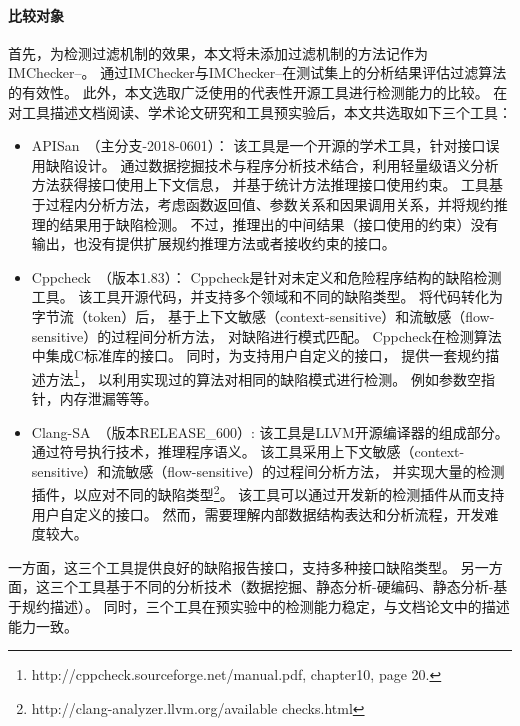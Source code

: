 \paragraph{ 比较对象}
首先，为检测过滤机制的效果，本文将未添加过滤机制的方法记作为IMChecker--。
通过IMChecker与IMChecker--在测试集上的分析结果评估过滤算法的有效性。
此外，本文选取广泛使用的代表性开源工具进行检测能力的比较。
在对工具描述文档阅读、学术论文研究和工具预实验后，本文共选取如下三个工具：
\begin{itemize}
	\item APISan~\cite{16-sec-apisan}（主分支-2018-0601）：
	该工具是一个开源的学术工具，针对接口误用缺陷设计。
	通过数据挖掘技术与程序分析技术结合，利用轻量级语义分析方法获得接口使用上下文信息，
	并基于统计方法推理接口使用约束。
	工具基于过程内分析方法，考虑函数返回值、参数关系和因果调用关系，并将规约推理的结果用于缺陷检测。
	不过，推理出的中间结果（接口使用的约束）没有输出，也没有提供扩展规约推理方法或者接收约束的接口。
	\item Cppcheck~\cite{cppcheck}（版本1.83）：
	Cppcheck是针对未定义和危险程序结构的缺陷检测工具。
	该工具开源代码，并支持多个领域和不同的缺陷类型。
	将代码转化为字节流（token）后，
	基于上下文敏感（context-sensitive）和流敏感（flow-sensitive）的过程间分析方法，
	对缺陷进行模式匹配。
	Cppcheck在检测算法中集成C标准库的接口。
	同时，为支持用户自定义的接口，
	提供一套规约描述方法\footnote{http://cppcheck.sourceforge.net/manual.pdf, chapter10, page 20.}，
	以利用实现过的算法对相同的缺陷模式进行检测。
	例如参数空指针，内存泄漏等等。
	\item Clang-SA~\cite{clang-sa}（版本RELEASE\_600）:
	该工具是LLVM开源编译器的组成部分。
	通过符号执行技术，推理程序语义。
	该工具采用上下文敏感（context-sensitive）和流敏感（flow-sensitive）的过程间分析方法，
	并实现大量的检测插件，以应对不同的缺陷类型\footnote{http://clang-analyzer.llvm.org/available checks.html}。
	该工具可以通过开发新的检测插件从而支持用户自定义的接口。
	然而，需要理解内部数据结构表达和分析流程，开发难度较大。
\end{itemize} 
一方面，这三个工具提供良好的缺陷报告接口，支持多种接口缺陷类型。
另一方面，这三个工具基于不同的分析技术（数据挖掘、静态分析-硬编码、静态分析-基于规约描述）。
同时，三个工具在预实验中的检测能力稳定，与文档论文中的描述能力一致。

